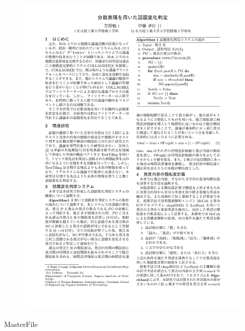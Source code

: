 \begin{figure}
	\centering
	\includegraphics[width=\linewidth,page=2]{../C.IPSJ80/submit.pdf}
\end{figure}
\clearpage
\expandafter\ifx\csname MasterFile\endcsname\relax

\fi
